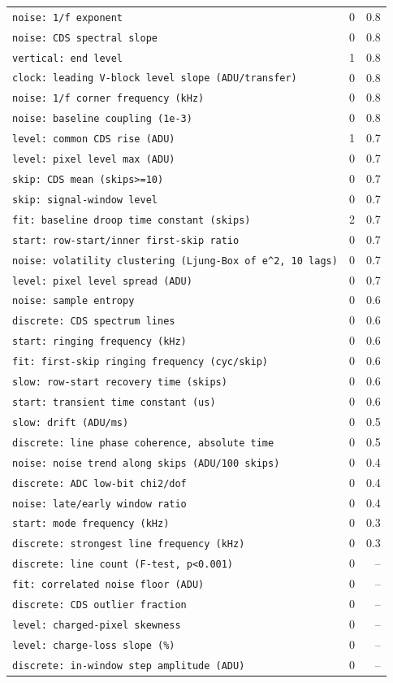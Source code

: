 \documentclass[10pt]{article}
\renewcommand{\_}{\oldunderscore\allowbreak}
\begin{document}
\begin{longtable}{>{\raggedright\arraybackslash}p{}rr}
\texttt{noise: 1/f exponent} & 0 & 0.8 \\
\texttt{noise: CDS spectral slope} & 0 & 0.8 \\
\texttt{vertical: end level} & 1 & 0.8 \\
\texttt{clock: leading V-block level slope (ADU/transfer)} & 0 & 0.8 \\
\texttt{noise: 1/f corner frequency (kHz)} & 0 & 0.8 \\
\texttt{noise: baseline coupling (1e-3)} & 0 & 0.8 \\
\texttt{level: common CDS rise (ADU)} & 1 & 0.7 \\
\texttt{level: pixel level max (ADU)} & 0 & 0.7 \\
\texttt{skip: CDS mean (skips\textgreater{}=10)} & 0 & 0.7 \\
\texttt{skip: signal-window level} & 0 & 0.7 \\
\texttt{fit: baseline droop time constant (skips)} & 2 & 0.7 \\
\texttt{start: row-start/inner first-skip ratio} & 0 & 0.7 \\
\texttt{noise: volatility clustering (Ljung-Box of e\textasciicircum{}2, 10 lags)} & 0 & 0.7 \\
\texttt{level: pixel level spread (ADU)} & 0 & 0.7 \\
\texttt{noise: sample entropy} & 0 & 0.6 \\
\texttt{discrete: CDS spectrum lines} & 0 & 0.6 \\
\texttt{start: ringing frequency (kHz)} & 0 & 0.6 \\
\texttt{fit: first-skip ringing frequency (cyc/skip)} & 0 & 0.6 \\
\texttt{slow: row-start recovery time (skips)} & 0 & 0.6 \\
\texttt{start: transient time constant (us)} & 0 & 0.6 \\
\texttt{slow: drift (ADU/ms)} & 0 & 0.5 \\
\texttt{discrete: line phase coherence, absolute time} & 0 & 0.5 \\
\texttt{noise: noise trend along skips (ADU/100 skips)} & 0 & 0.4 \\
\texttt{discrete: ADC low-bit chi2/dof} & 0 & 0.4 \\
\texttt{noise: late/early window ratio} & 0 & 0.4 \\
\texttt{start: mode frequency (kHz)} & 0 & 0.3 \\
\texttt{discrete: strongest line frequency (kHz)} & 0 & 0.3 \\
\texttt{discrete: line count (F-test, p\textless{}0.001)} & 0 & -- \\
\texttt{fit: correlated noise floor (ADU)} & 0 & -- \\
\texttt{discrete: CDS outlier fraction} & 0 & -- \\
\texttt{level: charged-pixel skewness} & 0 & -- \\
\texttt{level: charge-loss slope (\%)} & 0 & -- \\
\texttt{discrete: in-window step amplitude (ADU)} & 0 & -- \\
\end{longtable}
\end{document}
